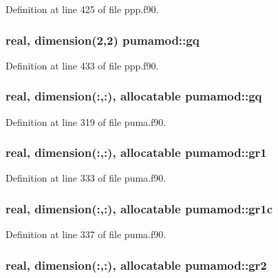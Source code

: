 \-Definition at line 425 of file ppp.\-f90.

\hypertarget{classpumamod_abcc9eef5e9aa5ecf04a6d77fd888feb9}{
\subsubsection[{gq}]{\setlength{\rightskip}{0pt plus 5cm}real, dimension(2,2) {\bf pumamod\-::gq}}}
\label{classpumamod_abcc9eef5e9aa5ecf04a6d77fd888feb9}


\-Definition at line 433 of file ppp.\-f90.

\hypertarget{classpumamod_a562c8285b90afd93ee2add1099a55e0f}{
\subsubsection[{gq}]{\setlength{\rightskip}{0pt plus 5cm}real, dimension(\-:,\-:), allocatable {\bf pumamod\-::gq}}}
\label{classpumamod_a562c8285b90afd93ee2add1099a55e0f}


\-Definition at line 319 of file puma.\-f90.

\hypertarget{classpumamod_a550fb7dbedcb399eeee029f09e0261c7}{
\subsubsection[{gr1}]{\setlength{\rightskip}{0pt plus 5cm}real, dimension(\-:,\-:), allocatable {\bf pumamod\-::gr1}}}
\label{classpumamod_a550fb7dbedcb399eeee029f09e0261c7}


\-Definition at line 333 of file puma.\-f90.

\hypertarget{classpumamod_a3ad097353e5e4017c75dd08d77f374f3}{
\subsubsection[{gr1c}]{\setlength{\rightskip}{0pt plus 5cm}real, dimension(\-:,\-:), allocatable {\bf pumamod\-::gr1c}}}
\label{classpumamod_a3ad097353e5e4017c75dd08d77f374f3}


\-Definition at line 337 of file puma.\-f90.

\hypertarget{classpumamod_acb504294dc512bdee020e63fcc43c51c}{
\subsubsection[{gr2}]{\setlength{\rightskip}{0pt plus 5cm}real, dimension(\-:,\-:), allocatable {\bf pumamod\-::gr2}}}
\label{classpumamod_acb504294dc512bdee020e63fcc43c51c}


